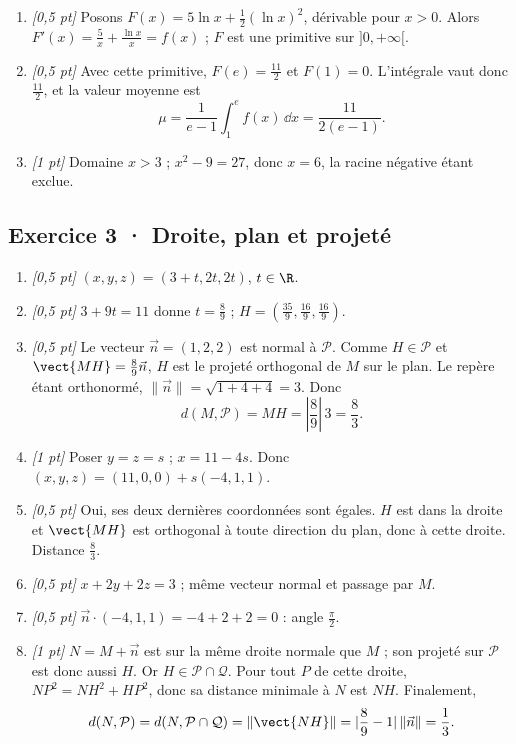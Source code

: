 \begin{enumerate}
\item \textit{[0{,}5 pt]} Posons $F(x)=5\ln x+\frac12(\ln x)^2$, dérivable pour $x>0$. Alors $F'(x)=\frac{5}{x}+\frac{\ln x}{x}=f(x)$ ; $F$ est une primitive sur $]0,+\infty[$.

\item \textit{[0{,}5 pt]} Avec cette primitive, $F(e)=\frac{11}{2}$ et $F(1)=0$. L'intégrale vaut donc $\frac{11}{2}$, et la valeur moyenne est
\[\mu=\frac{1}{e-1}\int_1^e f(x)\,\dd x=\frac{11}{2(e-1)}.\]

\item \textit{[1 pt]} Domaine $x>3$ ; $x^2-9=27$, donc $x=6$, la racine négative étant exclue.

\end{enumerate}

\subsection*{Exercice 3 · Droite, plan et projeté}\begin{enumerate}

\item \textit{[0{,}5 pt]} $(x,y,z)=(3+t,2t,2t)$, $t\in\R$.

\item \textit{[0{,}5 pt]} $3+9t=11$ donne $t=\frac{8}{9}$ ; $H=(\frac{35}{9},\frac{16}{9},\frac{16}{9})$.

\item \textit{[0{,}5 pt]} Le vecteur $\vec n=(1,2,2)$ est normal à $\mathcal P$. Comme $H\in\mathcal P$ et $\vect{MH}=\frac{8}{9}\vec n$, $H$ est le projeté orthogonal de $M$ sur le plan. Le repère étant orthonormé, $\|\vec n\|=\sqrt{1+4+4}=3$. Donc
\[d(M,\mathcal P)=MH=|\frac{8}{9}|\,3=\frac{8}{3}.\]

\item \textit{[1 pt]} Poser $y=z=s$ ; $x=11-4s$. Donc $(x,y,z)=(11,0,0)+s(-4,1,1)$.

\item \textit{[0{,}5 pt]} Oui, ses deux dernières coordonnées sont égales. $H$ est dans la droite et $\vect{MH}$ est orthogonal à toute direction du plan, donc à cette droite. Distance $\frac{8}{3}$.

\item \textit{[0{,}5 pt]} $x+2y+2z=3$ ; même vecteur normal et passage par $M$.

\item \textit{[0{,}5 pt]} $\vec n\cdot(-4,1,1)=-4+2+2=0$ : angle $\frac{\pi}{2}$.

\item \textit{[1 pt]} $N=M+\vec n$ est sur la même droite normale que $M$ ; son projeté sur $\mathcal P$ est donc aussi $H$. Or $H\in\mathcal P\cap\mathcal Q$. Pour tout $P$ de cette droite, $NP^2=NH^2+HP^2$, donc sa distance minimale à $N$ est $NH$. Finalement,
\[d(N,\mathcal P)=d(N,\mathcal P\cap\mathcal Q)=\|\vect{NH}\|=|\frac{8}{9}-1|\,\|\vec n\|=\frac{1}{3}.\]

\end{enumerate}

